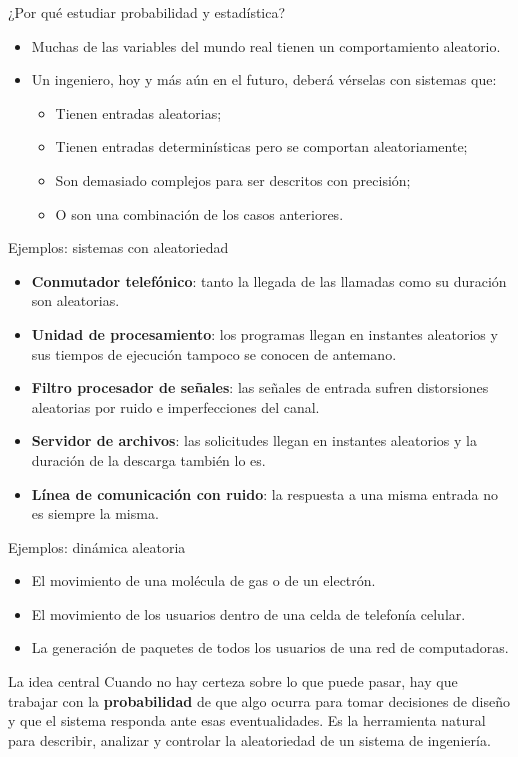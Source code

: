 \documentclass[aspectratio=169,11pt]{beamer}
\begin{document}
\begin{frame}{¿Por qué estudiar probabilidad y estadística?}
\begin{itemize}
\item Muchas de las variables del mundo real tienen un comportamiento aleatorio.
\item Un ingeniero, hoy y más aún en el futuro, deberá vérselas con sistemas que:
\begin{itemize}
\item Tienen entradas aleatorias;
\item Tienen entradas determinísticas pero se comportan aleatoriamente;
\item Son demasiado complejos para ser descritos con precisión;
\item O son una combinación de los casos anteriores.
\end{itemize}
\end{itemize}
\end{frame}

\begin{frame}{Ejemplos: sistemas con aleatoriedad}
\begin{itemize}\small
\item \textbf{Conmutador telefónico}: tanto la llegada de las llamadas como su duración son aleatorias.
\item \textbf{Unidad de procesamiento}: los programas llegan en instantes aleatorios y sus tiempos de ejecución tampoco se conocen de antemano.
\item \textbf{Filtro procesador de señales}: las señales de entrada sufren distorsiones aleatorias por ruido e imperfecciones del canal.
\item \textbf{Servidor de archivos}: las solicitudes llegan en instantes aleatorios y la duración de la descarga también lo es.
\item \textbf{Línea de comunicación con ruido}: la respuesta a una misma entrada no es siempre la misma.
\end{itemize}
\end{frame}

\begin{frame}{Ejemplos: dinámica aleatoria}
\begin{itemize}
\item El movimiento de una molécula de gas o de un electrón.
\item El movimiento de los usuarios dentro de una celda de telefonía celular.
\item La generación de paquetes de todos los usuarios de una red de computadoras.
\end{itemize}

\vspace{0.4em}
\begin{alertblock}{La idea central}
Cuando no hay certeza sobre lo que puede pasar, hay que trabajar con la \textbf{probabilidad} de que algo ocurra para tomar decisiones de diseño y que el sistema responda ante esas eventualidades. Es la herramienta natural para describir, analizar y controlar la aleatoriedad de un sistema de ingeniería.
\end{alertblock}
\end{frame}
\end{document}
